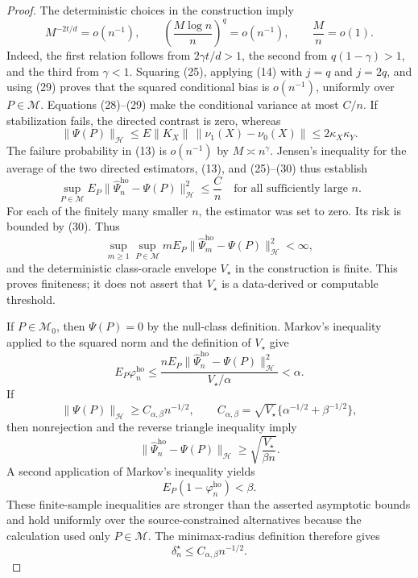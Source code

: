 \documentclass{article}
\begin{document}
\begin{proof}
The deterministic choices in the construction imply
\[
 M^{-2t/d}=o(n^{-1}),
 \qquad
 \left(\frac{M\log n}{n}\right)^q=o(n^{-1}),
 \qquad
 \frac{M}{n}=o(1).
 \tag{29}
\]
Indeed, the first relation follows from \(2\gamma t/d>1\), the second from \(q(1-\gamma)>1\), and the third from \(\gamma<1\).  Squaring (25), applying (14) with \(j=q\) and \(j=2q\), and using (29) proves that the squared conditional bias is \(o(n^{-1})\), uniformly over \(P\in\mathcal M\).  Equations (28)--(29) make the conditional variance at most \(C/n\).  If stabilization fails, the directed contrast is zero, whereas
\[
 \|\Psi(P)\|_{\mathcal H}
 \leq E\|K_X\|\,\|\nu_1(X)-\nu_0(X)\|
 \leq2\kappa_X\kappa_Y.
 \tag{30}
\]
The failure probability in (13) is \(o(n^{-1})\) by \(M\asymp n^\gamma\).  Jensen's inequality for the average of the two directed estimators, (13), and (25)--(30) thus establish
\[
 \sup_{P\in\mathcal M}
 E_P\|\widehat\Psi_n^{\mathrm{ho}}-\Psi(P)\|_{\mathcal H}^2
 \leq\frac{C}{n}
 \quad\text{for all sufficiently large }n.
 \tag{31}
\]
For each of the finitely many smaller \(n\), the estimator was set to zero.  Its risk is bounded by (30).  Thus
\[
 \sup_{m\geq1}\sup_{P\in\mathcal M}
 mE_P\|\widehat\Psi_m^{\mathrm{ho}}-\Psi(P)\|_{\mathcal H}^2<\infty,
 \tag{32}
\]
and the deterministic class-oracle envelope \(V_\star\) in the construction is finite.  This proves finiteness; it does not assert that \(V_\star\) is a data-derived or computable threshold.

If \(P\in\mathcal M_0\), then \(\Psi(P)=0\) by the null-class definition.  Markov's inequality applied to the squared norm and the definition of \(V_\star\) give
\[
 E_P\varphi_n^{\mathrm{ho}}
 \leq
 \frac{nE_P\|\widehat\Psi_n^{\mathrm{ho}}-\Psi(P)\|_{\mathcal H}^2}
      {V_\star/\alpha}
 <\alpha.
 \tag{33}
\]
If
\[
 \|\Psi(P)\|_{\mathcal H}
 \geq C_{\alpha,\beta}n^{-1/2},
 \qquad
 C_{\alpha,\beta}
 =\sqrt{V_\star}\{\alpha^{-1/2}+\beta^{-1/2}\},
 \tag{34}
\]
then nonrejection and the reverse triangle inequality imply
\[
 \|\widehat\Psi_n^{\mathrm{ho}}-\Psi(P)\|_{\mathcal H}
 \geq\sqrt{\frac{V_\star}{\beta n}}.
\]
A second application of Markov's inequality yields
\[
 E_P(1-\varphi_n^{\mathrm{ho}})<\beta.
 \tag{35}
\]
These finite-sample inequalities are stronger than the asserted asymptotic bounds and hold uniformly over the source-constrained alternatives because the calculation used only \(P\in\mathcal M\).  The minimax-radius definition therefore gives
\[
 \delta_n^\star\leq C_{\alpha,\beta}n^{-1/2}.
 \tag{36}
\]


\end{proof}
\end{document}
